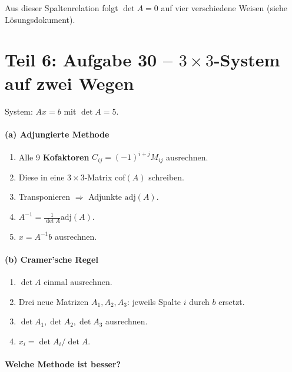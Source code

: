 \documentclass[a4paper,12pt]{article}
\begin{document}
Aus dieser Spaltenrelation folgt $\det A = 0$ auf vier verschiedene Weisen (siehe L\"osungsdokument).

\newpage

\part*{Teil 6: Aufgabe 30 -- $3 \times 3$-System auf zwei Wegen}

System: $Ax = b$ mit $\det A = 5$.

\subsection*{(a) Adjungierte Methode}

\begin{merkbox}[title={Schritte}]
\begin{enumerate}[nosep]
    \item Alle 9 \textbf{Kofaktoren} $C_{ij} = (-1)^{i+j} M_{ij}$ ausrechnen.
    \item Diese in eine $3\times 3$-Matrix $\text{cof}(A)$ schreiben.
    \item Transponieren $\Rightarrow$ Adjunkte $\text{adj}(A)$.
    \item $A^{-1} = \tfrac{1}{\det A} \text{adj}(A)$.
    \item $x = A^{-1} b$ ausrechnen.
\end{enumerate}
\end{merkbox}

\subsection*{(b) Cramer'sche Regel}

\begin{merkbox}[title={Schritte}]
\begin{enumerate}[nosep]
    \item $\det A$ einmal ausrechnen.
    \item Drei neue Matrizen $A_1, A_2, A_3$: jeweils Spalte $i$ durch $b$ ersetzt.
    \item $\det A_1, \det A_2, \det A_3$ ausrechnen.
    \item $x_i = \det A_i / \det A$.
\end{enumerate}
\end{merkbox}

\subsection*{Welche Methode ist besser?}
\end{document}
